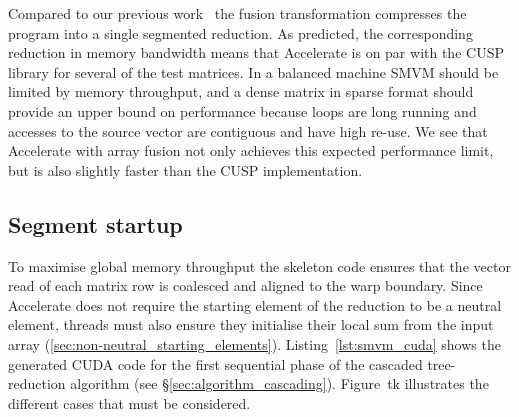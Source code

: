 Compared to our previous work~\cite{Chakravarty:2011fr} the fusion
transformation compresses the program into a single segmented reduction. As
predicted, the corresponding reduction in memory bandwidth means that Accelerate
is on par with the CUSP library for several of the test matrices. In a balanced
machine SMVM should be limited by memory throughput, and a dense matrix in
sparse format should provide an upper bound on performance because loops are
long running and accesses to the source vector are contiguous and have high
re-use. We see that Accelerate with array fusion not only achieves this expected
performance limit, but is also slightly faster than the CUSP implementation.

\subsection{Segment startup}

To maximise global memory throughput the skeleton code ensures that the vector
read of each matrix row is coalesced and aligned to the warp boundary. Since
Accelerate does not require the starting element of the reduction to be a
neutral element, threads must also ensure they initialise their local sum from
the input array (\ref{sec:non-neutral_starting_elements}).
Listing~\ref{lst:smvm_cuda} shows the generated CUDA code for the first
sequential phase of the cascaded tree-reduction algorithm (see
\S\ref{sec:algorithm_cascading}). Figure~tk illustrates the different cases that
must be considered.

